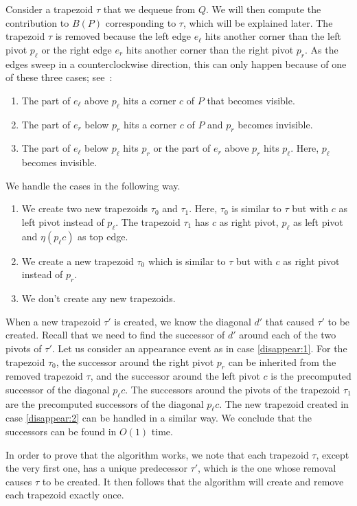 \documentclass{article}
\begin{document}
Consider a trapezoid $\tau$ that we dequeue from $Q$.
We will then compute the contribution to $B(P)$ corresponding to $\tau$, which will be explained later.
The trapezoid $\tau$ is removed because the left edge $e_\ell$ hits another corner than the left pivot $p_\ell$ or the right edge $e_r$ hits another corner than the right pivot $p_r$.
As the edges sweep in a counterclockwise direction, this can only happen because of one of these three cases; see~:
\begin{enumerate}
\item The part of $e_\ell$ above $p_\ell$ hits a corner $c$ of $P$ that becomes visible. \label{disappear:1}
\item The part of $e_r$ below $p_r$ hits a corner $c$ of $P$ and $p_r$ becomes invisible. \label{disappear:2}
\item The part of $e_\ell$ below $p_\ell$ hits $p_r$ or the part of $e_r$ above $p_r$ hits $p_\ell$. Here, $p_\ell$ becomes invisible. \label{disappear:3}
\end{enumerate}
We handle the cases in the following way.
\begin{enumerate}
\item We create two new trapezoids $\tau_0$ and $\tau_1$.
Here, $\tau_0$ is similar to $\tau$ but with $c$ as left pivot instead of $p_\ell$.
The trapezoid $\tau_1$ has $c$ as right pivot, $p_\ell$ as left pivot and $\eta(p_\ell c)$ as top edge.
\item We create a new trapezoid $\tau_0$ which is similar to $\tau$ but with $c$ as right pivot instead of $p_r$.
\item We don't create any new trapezoids.
\end{enumerate}

When a new trapezoid $\tau'$ is created, we know the diagonal $d'$ that caused $\tau'$ to be created.
Recall that we need to find the successor of $d'$ around each of the two pivots of $\tau'$.
Let us consider an appearance event as in case \ref{disappear:1}.
For the trapezoid $\tau_0$, the successor around the right pivot $p_r$ can be inherited from the removed trapezoid $\tau$, and the successor around the left pivot $c$ is the precomputed successor of the diagonal $p_\ell c$.
The successors around the pivots of the trapezoid $\tau_1$ are the precomputed successors of the diagonal $p_\ell c$.
The new trapezoid created in case \ref{disappear:2} can be handled in a similar way.
We conclude that the successors can be found in $O(1)$ time.

In order to prove that the algorithm works, we note that each trapezoid $\tau$, except the very first one, has a unique predecessor $\tau'$, which is the one whose removal causes $\tau$ to be created.
It then follows that the algorithm will create and remove each trapezoid exactly once.
\end{document}
